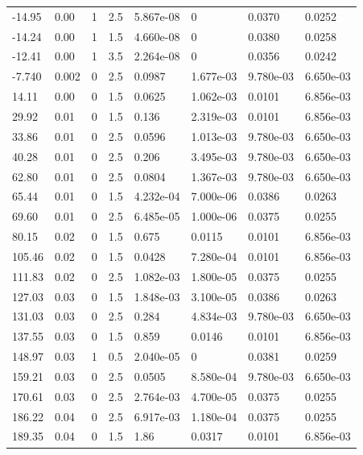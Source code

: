 \documentclass[preview]{standalone}
\begin{document}
{{\begin{tabular}{L{1.2cm}C{1.2cm} C{0.3cm}C{0.5cm} C{1.4cm}C{1.4cm} C{1.4cm}C{1.4cm}}
  -14.95  &  0.00  & 1     & 2.5 &  5.867e-08  & 0  & 0.0370 &  0.0252   \\ 
  -14.24  &  0.00  & 1     & 1.5 &  4.660e-08  & 0  & 0.0380 &  0.0258   \\ 
  -12.41  &  0.00  & 1     & 3.5 &  2.264e-08  & 0  & 0.0356 &  0.0242   \\ 
  -7.740  &  0.002  & 0     & 2.5 &  0.0987  & 1.677e-03  & 9.780e-03 &  6.650e-03   \\ 
  14.11  &  0.00  & 0     & 1.5 &  0.0625  & 1.062e-03  & 0.0101 &  6.856e-03   \\ 
  29.92  &  0.01  & 0     & 1.5 &  0.136  & 2.319e-03  & 0.0101 &  6.856e-03   \\ 
  33.86  &  0.01  & 0     & 2.5 &  0.0596  & 1.013e-03  & 9.780e-03 &  6.650e-03   \\ 
  40.28  &  0.01  & 0     & 2.5 &  0.206  & 3.495e-03  & 9.780e-03 &  6.650e-03   \\ 
  62.80  &  0.01  & 0     & 2.5 &  0.0804  & 1.367e-03  & 9.780e-03 &  6.650e-03   \\ 
  65.44  &  0.01  & 0     & 1.5 &  4.232e-04  & 7.000e-06  & 0.0386 &  0.0263   \\ 
  69.60  &  0.01  & 0     & 2.5 &  6.485e-05  & 1.000e-06  & 0.0375 &  0.0255   \\ 
  80.15  &  0.02  & 0     & 1.5 &  0.675  & 0.0115  & 0.0101 &  6.856e-03   \\ 
  105.46  &  0.02  & 0     & 1.5 &  0.0428  & 7.280e-04  & 0.0101 &  6.856e-03   \\ 
  111.83  &  0.02  & 0     & 2.5 &  1.082e-03  & 1.800e-05  & 0.0375 &  0.0255   \\ 
  127.03  &  0.03  & 0     & 1.5 &  1.848e-03  & 3.100e-05  & 0.0386 &  0.0263   \\ 
  131.03  &  0.03  & 0     & 2.5 &  0.284  & 4.834e-03  & 9.780e-03 &  6.650e-03   \\ 
  137.55  &  0.03  & 0     & 1.5 &  0.859  & 0.0146  & 0.0101 &  6.856e-03   \\ 
  148.97  &  0.03  & 1     & 0.5 &  2.040e-05  & 0  & 0.0381 &  0.0259   \\ 
  159.21  &  0.03  & 0     & 2.5 &  0.0505  & 8.580e-04  & 9.780e-03 &  6.650e-03   \\ 
  170.61  &  0.03  & 0     & 2.5 &  2.764e-03  & 4.700e-05  & 0.0375 &  0.0255   \\ 
  186.22  &  0.04  & 0     & 2.5 &  6.917e-03  & 1.180e-04  & 0.0375 &  0.0255   \\ 
  189.35  &  0.04  & 0     & 1.5 &  1.86  & 0.0317  & 0.0101 &  6.856e-03   \\ 

\end{tabular}}}
\end{document}
